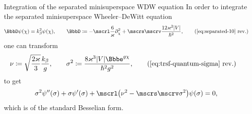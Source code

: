 \documentclass[8pt]{beamer}
\begin{document}
\begin{frame}%
{Integration of the separated minisuperspace WDW equation}%
In order to integrate the separated minisuperspace Wheeler--DeWitt equation
\begin{align}
\BbbD \rfun{\psi}{\chi} = k_\beta^2 \rfun{\psi}{\chi},\qquad
\BbbD \coloneqq
-\mscrl \frac{6}{\varkappa} \partial_\chi^2
+ \mscrs\mscrv \frac{12\varkappa^2\vbr{V}}{\hslash^2},
\tag{\ref{eq:separated-10} rev.}
\end{align}
one can transform
\begin{align}
\nu &\coloneqq \sqrt{\frac{2\varkappa}{3}}\frac{k_\beta}{g},\qquad
\sigma^2 \coloneqq 
\frac{8\varkappa^3\vbr{V}\ee^{g\chi}}{\hslash^2 g^2},
\tag{\ref{eq:trsf-quantum-sigma} rev.}
\end{align}
to get
\begin{align}
\sigma^2\rfun{\psi''}{\sigma}
+\sigma\rfun{\psi'}{\sigma}
+\mscrl\rbr{\nu^2-\mscrs\mscrv\sigma^2}\rfun{\psi}{\sigma} = 0,
\end{align}
which is of the standard Besselian form.
\end{frame}




%
\end{document}
